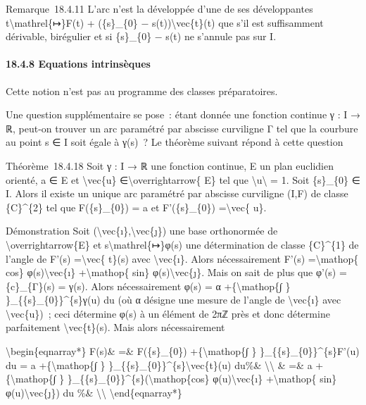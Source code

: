 \documentclass[]{article}
\begin{document}
Remarque~18.4.11 L'arc n'est la développée d'une de ses développantes
t\textbackslash{}mathrel\{↦\}F(t) + (\{s\}\_\{0\} −
s(t))\textbackslash{}vec\{t\}(t) que s'il est suffisamment dérivable,
birégulier et si \{s\}\_\{0\} − s(t) ne s'annule pas sur I.

\paragraph{18.4.8 Equations intrinsèques}

Cette notion n'est pas au programme des classes préparatoires.

Une question supplémentaire se pose~: étant donnée une fonction continue
γ : I → ℝ, peut-on trouver un arc paramétré par abscisse curviligne Γ
tel que la courbure au point s ∈ I soit égale à γ(s)~? Le théorème
suivant répond à cette question

Théorème~18.4.18 Soit γ : I → ℝ une fonction continue, E un plan
euclidien orienté, a ∈ E et \textbackslash{}vec\{u\}
∈\textbackslash{}overrightarrow\{ E\} tel que
\textbackslash{}\textbar{}u\textbackslash{}\textbar{} = 1. Soit
\{s\}\_\{0\} ∈ I. Alors il existe un unique arc paramétré par abscisse
curviligne (I,F) de classe \{C\}\^{}\{2\} tel que F(\{s\}\_\{0\}) = a et
F'(\{s\}\_\{0\}) =\textbackslash{}vec\{ u\}.

Démonstration Soit (\textbackslash{}vec\{ı\},\textbackslash{}vec\{ȷ\})
une base orthonormée de \textbackslash{}overrightarrow\{E\} et
s\textbackslash{}mathrel\{↦\}φ(s) une détermination de classe
\{C\}\^{}\{1\} de l'angle de F'(s) =\textbackslash{}vec\{ t\}(s) avec
\textbackslash{}vec\{ı\}. Alors nécessairement F'(s)
=\textbackslash{}mathop\{ cos\} φ(s)\textbackslash{}vec\{ı\}
+\textbackslash{}mathop\{ sin\} φ(s)\textbackslash{}vec\{ȷ\}. Mais on
sait de plus que φ'(s) = \{c\}\_\{Γ\}(s) = γ(s). Alors nécessairement
φ(s) = α +\{\textbackslash{}mathop\{∫ \}
\}\_\{\{s\}\_\{0\}\}\^{}\{s\}γ(u) du (où α désigne une mesure de l'angle
de \textbackslash{}vec\{ı\} avec \textbackslash{}vec\{u\})~; ceci
détermine φ(s) à un élément de 2πℤ près et donc détermine parfaitement
\textbackslash{}vec\{t\}(s). Mais alors nécessairement

\textbackslash{}begin\{eqnarray*\} F(s)\& =\& F(\{s\}\_\{0\})
+\{\textbackslash{}mathop\{∫ \} \}\_\{\{s\}\_\{0\}\}\^{}\{s\}F'(u) du =
a +\{\textbackslash{}mathop\{∫ \}
\}\_\{\{s\}\_\{0\}\}\^{}\{s\}\textbackslash{}vec\{t\}(u) du\%\&
\textbackslash{}\textbackslash{} \& =\& a +\{\textbackslash{}mathop\{∫
\} \}\_\{\{s\}\_\{0\}\}\^{}\{s\}(\textbackslash{}mathop\{cos\}
φ(u)\textbackslash{}vec\{ı\} +\textbackslash{}mathop\{ sin\}
φ(u)\textbackslash{}vec\{ȷ\}) du \%\& \textbackslash{}\textbackslash{}
\textbackslash{}end\{eqnarray*\}
\end{document}
